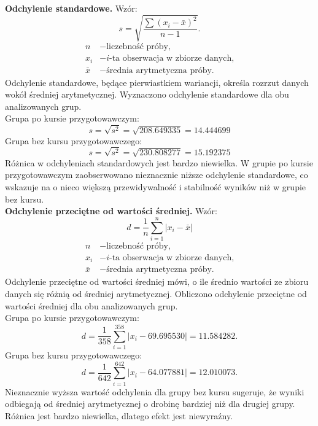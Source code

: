 \documentclass[12pt, a4paper]{article}
\begin{document}
	\textbf{Odchylenie standardowe.} Wzór:
	\[s = \sqrt{\dfrac{\sum (x_{i} - \bar{x})^2}{n - 1}}.\]
	\[
	\begin{aligned}
		n &- \text{liczebność próby,} \\
		x_i &- \text{$i$-ta obserwacja w zbiorze danych,} \\
		\bar{x} &- \text{średnia arytmetyczna próby.}
	\end{aligned}
	\]
	Odchylenie standardowe, będące pierwiastkiem wariancji, określa rozrzut danych wokół średniej arytmetycznej. Wyznaczono odchylenie standardowe dla obu analizowanych grup.\\
	Grupa po kursie przygotowawczym:\\
	\[
	s=\sqrt{s^2}=\sqrt{208.649335}=14.444699
	\]
	Grupa bez kursu przygotowawczego:
	\[
	s=\sqrt{s^2}=\sqrt{230.808277}=15.192375
	\]
	Różnica w odchyleniach standardowych jest bardzo niewielka. W grupie po kursie przygotowawczym zaobserwowano nieznacznie niższe odchylenie standardowe, co wskazuje na o nieco większą przewidywalność i stabilność wyników niż w grupie bez kursu. \\
	

	\textbf{Odchylenie przeciętne od wartości średniej.} Wzór:
	\[
	d = \frac{1}{n}\sum_{i=1}^{n} |x_i - \bar{x}|
	\]
	\[
	\begin{aligned}
		n &- \text{liczebność próby,} \\
		x_i &- \text{$i$-ta obserwacja w zbiorze danych,} \\
		\bar{x} &- \text{średnia arytmetyczna próby.}
	\end{aligned}
	\]
	Odchylenie przeciętne od wartości średniej mówi, o ile średnio wartości ze zbioru danych się różnią od średniej arytmetycznej.
	Obliczono odchylenie przeciętne od wartości średniej dla obu analizowanych grup.\\
	Grupa po kursie przygotowawczym:\\
	\[
	d = \frac{1}{358}\sum_{i=1}^{358} |x_i - 69.695530|=11.584282.
	\]
	Grupa bez kursu przygotowawczego:\\
	\[
	d = \frac{1}{642}\sum_{i=1}^{642} |x_i - 64.077881|=12.010073.
	\]
	Nieznacznie wyższa wartość odchylenia dla grupy bez kursu sugeruje, że wyniki odbiegają od średniej arytmetycznej o drobinę bardziej niż dla drugiej grupy. Różnica jest bardzo niewielka, dlatego efekt jest niewyraźny. \\ 
	
\end{document}
